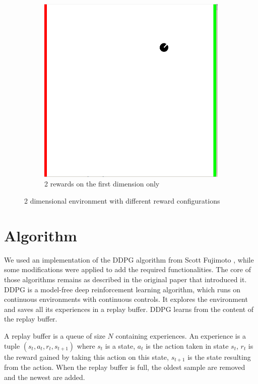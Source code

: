 \documentclass{article}
\begin{document}
\begin{figure}[H]
\begin{subfigure}[b]{0.3\linewidth}
    \includegraphics[width=\linewidth]{env/visualizations/2d_1reward.png}
    \caption{2 rewards on the first dimension only}
    \label{fig:2d_1_env}
  \end{subfigure}
  \hspace{2cm}
  \caption{2 dimensional environment with different reward configurations}
  \label{fig:2d_env}
\end{figure}


\section{Algorithm}

We used an implementation of the DDPG algorithm from Scott Fujimoto \cite{fujimoto_pytorch_2019}, while some modifications were applied to add the required functionalities. The core of those algorithms remains as described in the original paper \cite{lillicrap_continuous_2015} that introduced it. DDPG is a model-free deep reinforcement learning algorithm, which runs on continuous environments with continuous controls. It explores the environment and saves all its experiences in a replay buffer. DDPG learns from the content of the replay buffer.

A replay buffer \cite{mnih_playing_2013} is a queue of size $N$ containing experiences. An experience is a tuple $({s}_{t},{a}_{t},{r}_{t},{s}_{t+1})$ where ${s}_{t}$ is a state, ${a}_{t}$ is the action taken in state ${s}_{t}$, ${r}_{t}$ is the reward gained by taking this action on this state, ${s}_{t+1}$ is the state resulting from the action. When the replay buffer is full, the oldest sample are removed and the newest are added.
\end{document}
